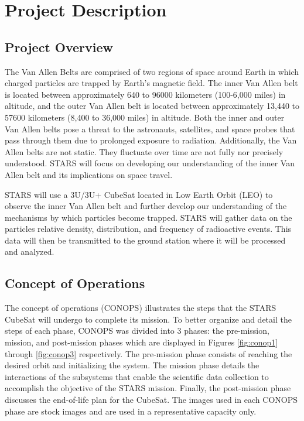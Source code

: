 
\section{Project Description}
\subsection{Project Overview}

The Van Allen Belts are comprised of two regions of space around Earth in which charged particles are trapped by Earth's magnetic field. The inner Van Allen belt is located between approximately 640 to 96000 kilometers (100-6,000 miles) in altitude, and the outer Van Allen belt is located between approximately 13,440 to 57600 kilometers (8,400 to 36,000 miles) in altitude. \cite{VanAllen_1} Both the inner and outer Van Allen belts pose a threat to the astronauts, satellites, and space probes that pass through them due to prolonged exposure to radiation. Additionally, the Van Allen belts are not static. They fluctuate over time are not fully nor precisely understood. STARS will focus on developing our understanding of the inner Van Allen belt and its implications on space travel.

STARS will use a 3U/3U+ CubeSat located in Low Earth Orbit (LEO) to observe the inner Van Allen belt and further develop our understanding of the mechanisms by which particles become trapped. STARS will gather data on the particles relative density, distribution, and frequency of radioactive events. This data will then be transmitted to the ground station where it will be processed and analyzed.

\subsection{Concept of Operations}
The concept of operations (CONOPS) illustrates the steps that the STARS CubeSat will undergo to complete its mission. To better organize and detail the steps of each phase, CONOPS was divided into 3 phases: the pre-mission, mission, and post-mission phases which are displayed in Figures \ref{fig:conop1} through \ref{fig:conop3} respectively. The pre-mission phase consists of reaching the desired orbit and initializing the system.  The mission phase details the interactions of the subsystems that enable the scientific data collection to accomplish the objective of the STARS mission. Finally, the post-mission phase discusses the end-of-life plan for the CubeSat. The images used in each CONOPS phase are stock images and are used in a representative capacity only.  

